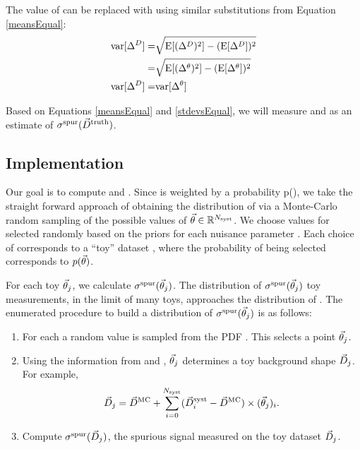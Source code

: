 The value of \stdD can be replaced with \stdTheta using similar substitutions from Equation \ref{meansEqual}:
\begin{equation}\label{stdevsEqual}
\begin{split}
\mathrm{var}[\Delta^D] =& \sqrt{\mathrm{E}[(\Delta^D)^2]-(\mathrm{E}[\Delta^D])^2} \\
             =& \sqrt{\mathrm{E}[(\Delta^\theta)^2]-(\mathrm{E}[\Delta^\theta])^2} \\
\mathrm{var}[\Delta^D] =& \mathrm{\mathrm{var}[\Delta^\theta]} \\
\end{split}
\end{equation}

Based on Equations \ref{meansEqual} and \ref{stdevsEqual}, we will measure \meanTheta and \stdTheta as an estimate of $\sigma^\mathrm{spur}(\vec{D}^\mathrm{truth})$.

\subsection*{Implementation}

Our goal is to compute \meanTheta and \stdTheta. Since \deltaTheta is weighted by a probability p(\nps), we take the straight forward approach of obtaining the distribution of \deltaTheta via a Monte-Carlo random sampling of the possible values of $\vec{\theta}\in\mathbb{R}^{N_\mathrm{syst}}$. We choose values for \nps selected randomly based on the priors \npprob for each nuisance parameter \np. Each choice of \nps corresponds to a ``toy'' dataset \template, where the probability of being selected corresponds to $p(\vec{\theta})$.

For each toy $\vec{\theta}_j$, we calculate $\sigma^\mathrm{spur}(\vec{\theta}_j)$. The distribution of $\sigma^\mathrm{spur}(\vec{\theta}_j)$ toy measurements, in the limit of many toys, approaches the distribution of \deltaTheta. The enumerated procedure to build a distribution of $\sigma^\mathrm{spur}(\vec{\theta}_j)$ is as follows:
\begin{enumerate}
    \item For each \np a random value is sampled from the PDF \npprob. This selects a point $\vec{\theta}_j$.
    \item Using the information from \mc and \systs, $\vec{\theta}_j$ determines a toy background shape $\vec{D}_j$. For example,
            \begin{equation}\label{map}
               \vec{D}_j = \vec{D}^\mathrm{MC} + \sum_{i=0}^{N_\mathrm{syst}} (\vec{D}^\mathrm{syst}_i-\vec{D}^\mathrm{MC})\times(\vec{\theta}_j)_i.
            \end{equation}
    \item Compute $\sigma^\mathrm{spur}(\vec{D}_j)$, the spurious signal measured on the toy dataset $\vec{D}_j$.
\end{enumerate}

